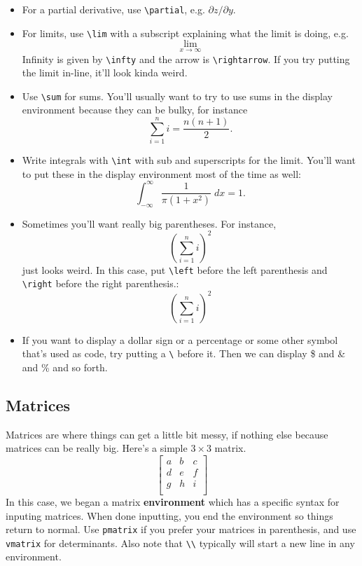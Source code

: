 \documentclass[12pt]{article}
\begin{document}
\begin{itemize}
		\item For a partial derivative, use \verb|\partial|, e.g. $\partial z/\partial y$. 
		
		\item For limits, use \verb|\lim| with a subscript explaining what the limit is 
		doing, e.g.
				\[ \lim_{x \rightarrow \infty}  \]
		Infinity is given by \verb|\infty| and  the arrow is \verb|\rightarrow|. If you 
		try putting the limit in-line, it'll look kinda weird. 
		
		\item Use \verb|\sum| for sums. You'll usually want to try to use sums in the 
		display environment because they can be bulky, for instance
			\[\sum_{i=1}^n i = \frac{n(n+1)}{2}.\]
			
		\item Write integrals with \verb|\int| with sub and superscripts for the limit. 
		You'll want to put these in the display environment most of the time as well:
			\[ \int_{-\infty}^{\infty} \frac{1}{\pi(1+x^2)} \; dx = 1 .\]
			
		\item Sometimes you'll want really big parentheses. For instance,
				\[ ( \sum_{i=1}^n i)^2	\]
			just looks weird. In this case, put \verb|\left| before the left parenthesis 
			and \verb|\right| before the right parenthesis.:
				\[ \left( \sum_{i=1}^n i \right)^2	\]
				
		\item If you want to display a dollar sign or a percentage or some other symbol 
		that's used as code, try putting a \verb|\| before it. Then we can display \$ and 
		\& and \% and so forth.
	\end{itemize}
	
	
\subsection{Matrices}

Matrices are where things can get a little bit messy, if nothing else because matrices can be 
really big. Here's a simple $3 \times 3$ matrix. 
\[
	\begin{bmatrix}
		a	&	b	&	c	\\
		d	&	e	&	f	\\
		g	&	h	&	i	\\
	\end{bmatrix}
\]
In this case, we began a matrix \textbf{environment} which has a specific syntax for inputing
matrices. When done inputting, you end the environment so things return to normal. Use 
\verb|pmatrix| if you prefer your matrices in parenthesis, and use \verb|vmatrix| for 
determinants. Also note that \verb|\\| typically will start a new line in any environment.
\end{document}
